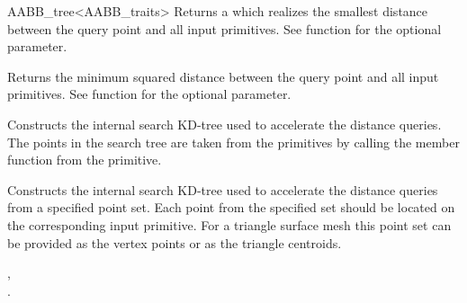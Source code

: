 \begin{ccRefClass}{AABB_tree<AABB_traits>}
{Returns a  which realizes the smallest distance between the query point and all input primitives. See  function for the optional  parameter. }

{Returns the minimum squared distance between the query point and all input primitives. See  function for the optional  parameter. }


{ Constructs the internal search KD-tree used to accelerate the distance queries. The points in the search tree are taken from the primitives by calling the member function  from the primitive.}

\begin{ccAdvanced}
{ Constructs the internal search KD-tree used to accelerate the distance queries from a specified point set. Each point from the specified  set should be located on the corresponding input primitive. For a triangle surface mesh this point set can be provided as the vertex points or as the triangle centroids.}
\end{ccAdvanced}

\ccSeeAlso

, \\
.

\end{ccRefClass}

\ccRefPageEnd

